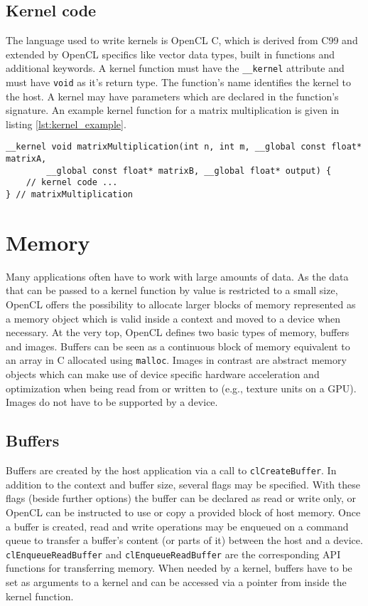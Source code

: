 \subsection{Kernel code}
The language used to write kernels is OpenCL C, which is derived from C99 and extended by OpenCL specifics like vector data types, built in functions and additional keywords. A kernel function must have the \lstinline!__kernel! attribute and must have \lstinline!void! as it's return type. The function's name identifies the kernel to the host. A kernel may have parameters which are declared in the function's signature. An example kernel function for a matrix multiplication is given in listing \ref{lst:kernel_example}.

\begin{lstlisting}[caption={An example of a kernel function's signature.},label={lst:kernel_example},language=CL]
__kernel void matrixMultiplication(int n, int m, __global const float* matrixA,
		__global const float* matrixB, __global float* output) {
	// kernel code ...
} // matrixMultiplication
\end{lstlisting}

\section{Memory}
Many applications often have to work with large amounts of data. As the data that can be passed to a kernel function by value is restricted to a small size, OpenCL offers the possibility to allocate larger blocks of memory represented as a memory object which is valid inside a context and moved to a device when necessary. At the very top, OpenCL defines two basic types of memory, buffers and images. Buffers can be seen as a continuous block of memory equivalent to an array in C allocated using \lstinline!malloc!. Images in contrast are abstract memory objects which can make use of device specific hardware acceleration and optimization when being read from or written to (e.g., texture units on a GPU). Images do not have to be supported by a device. \cite[pp.23]{opencl_book}

\subsection{Buffers}
Buffers are created by the host application via a call to \lstinline!clCreateBuffer!. In addition to the context and buffer size, several flags may be specified. With these flags (beside further options) the buffer can be declared as read or write only, or OpenCL can be instructed to use or copy a provided block of host memory. Once a buffer is created, read and write operations may be enqueued on a command queue to transfer a buffer's content (or parts of it) between the host and a device. \lstinline!clEnqueueReadBuffer! and \lstinline!clEnqueueReadBuffer! are the corresponding API functions for transferring memory. When needed by a kernel, buffers have to be set as arguments to a kernel and can be accessed via a pointer from inside the kernel function. \cite[p.24]{opencl_book}


